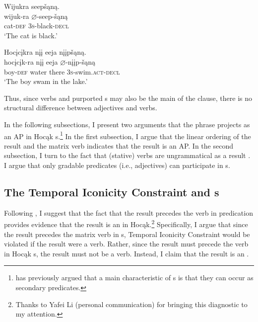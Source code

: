 \documentclass[output=paper]{LSP/langsci}
\begin{document}
\begin{exe}
\ex\label{ex:rosen:31}
\begin{xlist}

\ex \glll Wijukra seepšąną. \\
wijuk-ra {$\varnothing$}-seep-šąną\\
cat-\textsc{def} \textsc{3s}-black-\textsc{decl}\\
\glt `The cat is black.'


\ex \glll Hocįcįkra nįį eeja nįįpšąną.\\
hocįcįk-ra nįį eeja {$\varnothing$}-nįįp-šąną\\
boy-\textsc{def} water there \textsc{3s}-swim.\textsc{act}-\textsc{decl}\\
\glt `The boy swam in the lake.'

\end{xlist}
\end{exe}


Thus, since verbs and purported s may also be the main  of the clause, there is no structural difference between adjectives and verbs.

In the following subsections, I present two arguments that the  phrase projects as an AP in Hocąk s.\footnote{\citet{Baker2003} has previously argued that a main characteristic of s is that they can occur as secondary  predicates.} In the first subsection, I argue that the linear ordering of the result and the matrix verb indicates that the result is an AP. In the second subsection, I turn to the fact that (stative) verbs are ungrammatical as a result . I argue that only gradable predicates (i.e., adjectives) can participate in s. 

\subsection{The Temporal Iconicity Constraint and s}

Following \citet{Li1993}, I suggest that the fact that the result precedes the verb in  predication provides evidence that the result is an  in Hocąk.\footnote{Thanks to Yafei Li (personal communication) for bringing this diagnostic to my attention.} Specifically, I argue that since the result precedes the matrix verb in s,  Temporal Iconicity Constraint would be violated if the result were a verb. Rather, since the result must precede the verb in Hocąk s, the result must not be a verb. Instead, I claim that the result is an .
\end{document}
